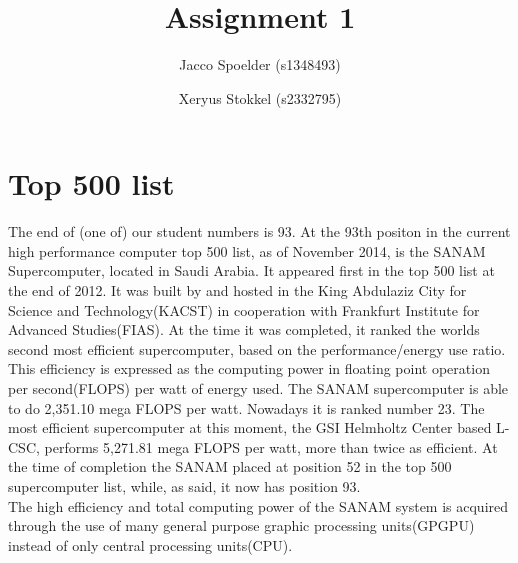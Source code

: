 \documentclass[a4paper]{article}
\title{Assignment 1}
\author{Jacco Spoelder (s1348493) \and Xeryus Stokkel (s2332795)}
\begin{document}
\maketitle

\section{Top 500 list}
The end of (one of) our student numbers is 93. At the 93th positon in the current high performance computer top 500 list, as of November 2014, is the SANAM Supercomputer, located in Saudi Arabia. It appeared first in the top 500 list at the end of 2012. It was built by and hosted in the King Abdulaziz City for Science and Technology(KACST) in cooperation with Frankfurt Institute for Advanced Studies(FIAS). At the time it was completed, it ranked the worlds second most efficient supercomputer, based on the performance/energy use ratio. This efficiency is expressed as the computing power in floating point operation per second(FLOPS) per watt of energy used. The SANAM supercomputer is able to do 2,351.10 mega FLOPS per watt. Nowadays it is ranked number 23. The most efficient supercomputer at this moment, the GSI Helmholtz Center based L-CSC, performs 5,271.81 mega FLOPS per watt, more than twice as efficient. At the time of completion the SANAM placed at position 52 in the top 500 supercomputer list, while, as said, it now has position 93. 
\\
The high efficiency and total computing power of the SANAM system is acquired through the use of many general purpose graphic processing units(GPGPU) instead of only central processing units(CPU).
\end{document}
